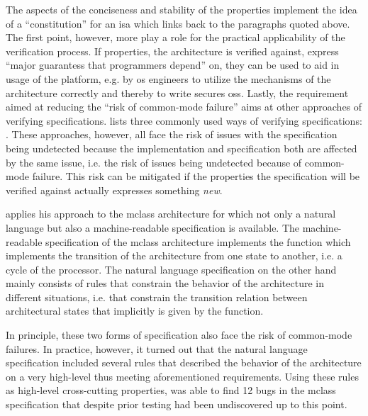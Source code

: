 The aspects of the conciseness and stability of the properties implement the idea of a \enquote{constitution} for an \gls{isa} which links back to the paragraphs quoted above.
The first point, however, more play a role for the practical applicability of the verification process.
If properties, the architecture is verified against, express \enquote{major guarantess that programmers  depend} on, they can be used to aid in usage of the platform, e.g. by \gls{os} engineers to utilize the mechanisms of the architecture correctly and thereby to write secures \glspl{os}.
Lastly, the requirement aimed at reducing the \enquote{risk of common-mode failure} aims at other approaches of verifying specifications.
\citeauthor{Reid17} lists three commonly used ways of verifying specifications: .
These approaches, however, all face the risk of issues with the specification being undetected because the implementation and specification both are affected by the same issue, i.e. the risk of issues being undetected because of common-mode failure.
This risk can be mitigated if the properties the specification will be verified against actually expresses something \textit{new}.

\citeauthor{Reid17} applies his approach to the \gls{mclass} architecture for which not only a natural language but also a machine-readable specification is available.
The machine-readable specification of the \gls{mclass} architecture implements the function  which implements the transition of the architecture from one state to another, i.e. a cycle of the processor.
The natural language specification on the other hand mainly consists of rules that constrain the behavior of the architecture in different situations, i.e. that constrain the transition relation between architectural states that implicitly is given by the  function.

In principle, these two forms of specification also face the risk of common-mode failures.
In practice, however, it turned out that the natural language specification included several rules that described the behavior of the architecture on a very high-level thus meeting aforementioned requirements.
Using these rules as high-level cross-cutting properties, \citeauthor{Reid17} was able to find 12 bugs in the \gls{mclass} specification that despite prior testing had been undiscovered up to this point.

